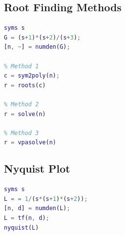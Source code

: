 \documentclass[letterpaper,12pt]{article}
\begin{document}
\subsection{Root Finding Methods}
\begin{lstlisting}[language=Matlab]
syms s
G = (s+1)*(s+2)/(s+3);
[n, ~] = numden(G);

% Method 1  
c = sym2poly(n);
r = roots(c)

% Method 2
r = solve(n)

% Method 3
r = vpasolve(n)
\end{lstlisting}

\subsection{Nyquist Plot}
\begin{lstlisting}[language=Matlab]
syms s
L = = 1/(s*(s+1)*(s+2));
[n, d] = numden(L);
L = tf(n, d);
nyquist(L)
\end{lstlisting}
\end{document}
